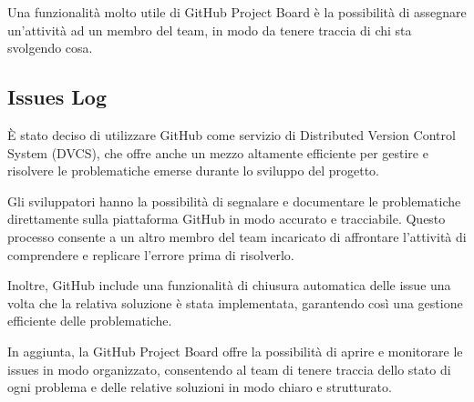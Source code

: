 Una funzionalità molto utile di GitHub Project Board è la possibilità di assegnare un'attività ad un membro del team, in modo da tenere traccia di chi sta svolgendo cosa.\\

\subsection{Issues Log}
È stato deciso di utilizzare GitHub come servizio di Distributed Version Control System (DVCS), che offre anche un mezzo altamente efficiente per gestire
e risolvere le problematiche emerse durante lo sviluppo del progetto. 

Gli sviluppatori hanno la possibilità di segnalare e documentare
le problematiche direttamente sulla piattaforma GitHub in modo accurato e tracciabile. Questo processo consente a un altro membro del
team incaricato di affrontare l'attività di comprendere e replicare l'errore prima di risolverlo.

Inoltre, GitHub include una funzionalità
di chiusura automatica delle issue una volta che la relativa soluzione è stata implementata, garantendo così una gestione efficiente delle problematiche.

In aggiunta, la GitHub Project Board offre la possibilità di aprire e monitorare le issues in modo organizzato, consentendo al team di tenere traccia
dello stato di ogni problema e delle relative soluzioni in modo chiaro e strutturato.

